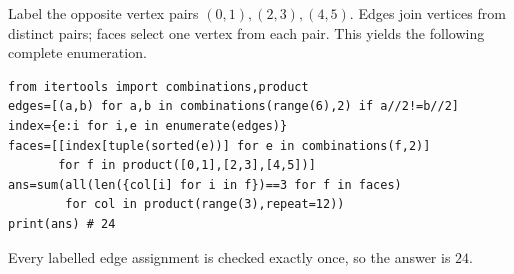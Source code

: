 Label the opposite vertex pairs $(0,1),(2,3),(4,5)$. Edges join vertices from distinct pairs; faces select one vertex from each pair. This yields the following complete enumeration.\begin{verbatim}
from itertools import combinations,product
edges=[(a,b) for a,b in combinations(range(6),2) if a//2!=b//2]
index={e:i for i,e in enumerate(edges)}
faces=[[index[tuple(sorted(e))] for e in combinations(f,2)]
       for f in product([0,1],[2,3],[4,5])]
ans=sum(all(len({col[i] for i in f})==3 for f in faces)
        for col in product(range(3),repeat=12))
print(ans) # 24
\end{verbatim}
Every labelled edge assignment is checked exactly once, so the answer is $\boxed{24}$.
